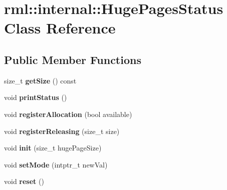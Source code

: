 \hypertarget{classrml_1_1internal_1_1HugePagesStatus}{}\section{rml\+:\+:internal\+:\+:Huge\+Pages\+Status Class Reference}
\label{classrml_1_1internal_1_1HugePagesStatus}
\subsection*{Public Member Functions}
\begin{DoxyCompactItemize}
\item 
\hypertarget{classrml_1_1internal_1_1HugePagesStatus_a58cdfce0b3c8f6a85b54b91af5ad664d}{}size\+\_\+t {\bfseries get\+Size} () const \label{classrml_1_1internal_1_1HugePagesStatus_a58cdfce0b3c8f6a85b54b91af5ad664d}

\item 
\hypertarget{classrml_1_1internal_1_1HugePagesStatus_a706f5c4bc0c1d17d94f38306b39b365d}{}void {\bfseries print\+Status} ()\label{classrml_1_1internal_1_1HugePagesStatus_a706f5c4bc0c1d17d94f38306b39b365d}

\item 
\hypertarget{classrml_1_1internal_1_1HugePagesStatus_a9e0ddd06596a6f83e0d6527e1a5ecad6}{}void {\bfseries register\+Allocation} (bool available)\label{classrml_1_1internal_1_1HugePagesStatus_a9e0ddd06596a6f83e0d6527e1a5ecad6}

\item 
\hypertarget{classrml_1_1internal_1_1HugePagesStatus_a8ac3ca32185175f0dfa04a94d55dff9b}{}void {\bfseries register\+Releasing} (size\+\_\+t size)\label{classrml_1_1internal_1_1HugePagesStatus_a8ac3ca32185175f0dfa04a94d55dff9b}

\item 
\hypertarget{classrml_1_1internal_1_1HugePagesStatus_a9fbf28c469c9ba7fb5c34f6eaab7b80b}{}void {\bfseries init} (size\+\_\+t huge\+Page\+Size)\label{classrml_1_1internal_1_1HugePagesStatus_a9fbf28c469c9ba7fb5c34f6eaab7b80b}

\item 
\hypertarget{classrml_1_1internal_1_1HugePagesStatus_a66ecd8c38340e89401f3dd7851e749b7}{}void {\bfseries set\+Mode} (intptr\+\_\+t new\+Val)\label{classrml_1_1internal_1_1HugePagesStatus_a66ecd8c38340e89401f3dd7851e749b7}

\item 
\hypertarget{classrml_1_1internal_1_1HugePagesStatus_a490395753c5906d5bb0173227e0d0f92}{}void {\bfseries reset} ()\label{classrml_1_1internal_1_1HugePagesStatus_a490395753c5906d5bb0173227e0d0f92}

\end{DoxyCompactItemize}
